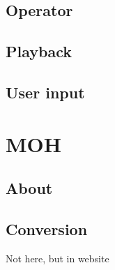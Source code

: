 \subsection{Operator}
\subsection{Playback}
\subsection{User input}



\section{MOH}
\subsection{About}
\subsection{Conversion}
Not here, but in website 